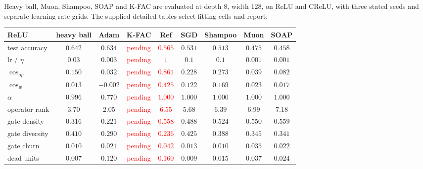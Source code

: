 \documentclass{article}
\newcommand{\nat}[1]{\textcolor{red}{#1}}
\theoremstyle{definition}
\theoremstyle{remark}
\begin{document}
Heavy ball, Muon, Shampoo, SOAP and K-FAC are evaluated at depth $8$, width $128$, on ReLU and CReLU, with three stated seeds and separate learning-rate grids. The supplied detailed tables select fitting cells and report:

\begin{center}\small
\begin{adjustbox}{max width=\linewidth}
\begin{tabular}{lcccccccc}
\toprule
ReLU & heavy ball & Adam & K-FAC & Ref & SGD & Shampoo & Muon & SOAP \\
\midrule
test accuracy & $\mathbf{0.642}$ & $0.634$ & \nat{pending} & \nat{$0.565$} & $0.531$ & $0.513$ & $0.475$ & $0.458$ \\
lr / $\eta$ & $0.03$ & $0.003$ & \nat{pending} & \nat{$1$} & $0.1$ & $0.1$ & $0.001$ & $0.001$ \\
\midrule
$\cos_{op}$ & $0.150$ & $0.032$ & \nat{pending} & \nat{$0.861$} & $0.228$ & $0.273$ & $0.039$ & $0.082$ \\
$\cos_w$ & $0.013$ & $-0.002$ & \nat{pending} & \nat{$0.425$} & $0.122$ & $0.169$ & $0.023$ & $0.017$ \\
$\alpha$ & $0.996$ & $0.770$ & \nat{pending} & \nat{$1.000$} & $1.000$ & $1.000$ & $1.000$ & $1.000$ \\
operator rank & $3.70$ & $\mathbf{2.05}$ & \nat{pending} & \nat{$6.55$} & $5.68$ & $6.39$ & $6.99$ & $7.18$ \\
gate density & $0.316$ & $\mathbf{0.221}$ & \nat{pending} & \nat{$0.558$} & $0.488$ & $0.524$ & $0.550$ & $0.559$ \\
gate diversity & $0.410$ & $0.290$ & \nat{pending} & \nat{$0.236$} & $0.425$ & $0.388$ & $0.345$ & $0.341$ \\
gate churn & $0.010$ & $0.021$ & \nat{pending} & \nat{$0.042$} & $0.013$ & $0.010$ & $0.035$ & $0.022$ \\
dead units & $0.007$ & $0.120$ & \nat{pending} & \nat{$0.160$} & $0.009$ & $0.015$ & $0.037$ & $0.024$ \\
\bottomrule
\end{tabular}
\end{adjustbox}
\end{center}
\end{document}

